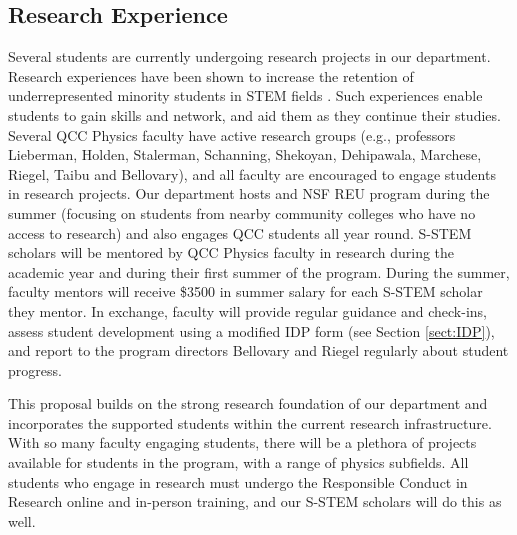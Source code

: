 \documentclass[12pt]{article}
\newcommand\new[1]{{\color{blue}#1}}
\begin{document}
\subsection{\normalsize{Research Experience}}
\vspace{-2mm}
Several students are currently undergoing research projects in our department.  Research experiences have been shown to increase the retention of underrepresented minority students in STEM fields \citep{Graham,Russell}.   Such experiences  enable students to gain skills and network, and aid them as they continue their studies.  Several QCC Physics faculty have active research groups (e.g., professors Lieberman, Holden, Stalerman, Schanning, Shekoyan, Dehipawala, Marchese, Riegel, Taibu and Bellovary), and all faculty are encouraged to engage students in research projects.  Our department hosts and NSF REU program during the summer (focusing on students from nearby community colleges who have no access to research) and also engages QCC students all year round.  S-STEM scholars will be mentored by QCC Physics faculty in research during the academic year and during their first summer of the program.  During the summer, faculty mentors will receive \$3500 in summer salary for each S-STEM scholar they mentor.  In exchange, faculty will provide regular guidance and check-ins, assess student development using a modified IDP form (see Section \ref{sect:IDP}), and report to the program directors Bellovary and Riegel regularly about student progress.  

This proposal builds on the strong research foundation of our department and incorporates the supported students within the current research infrastructure.  With so many faculty engaging students, there will be a plethora of projects available for students in the program, with a range of physics subfields.  All students who engage in research must undergo the Responsible Conduct in Research online and in-person training, and our S-STEM scholars will do this as well.
\vspace{-5mm}
\end{document}
